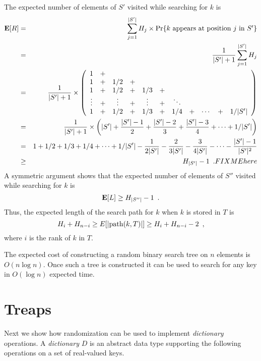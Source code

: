 The expected number of elements of $S'$ visited while searching for
$k$ is
\begin{eqnarray*}
    \mathbf{E}[R]&=& \sum_{j=1}^{|S'|} H_j
	\times\Pr\{\mbox{$k$ appears at position $j$ in $S'$}\} \\
    &=& \frac{1}{|S'|+1}\sum_{j=1}^{|S'|} H_j \\
    &=& \frac{1}{|S'|+1} \times \left(\begin{array}{ccccccccccccccccc}
            1 &+& \\
            1 &+& 1/2 &+& \\
            1 &+& 1/2 &+& 1/3 &+& \\
            \vdots &+& \vdots &+& \vdots &+& \ddots \\
            1 &+& 1/2 &+& 1/3 &+& 1/4 &+&\cdots &+& 1/|S'| \\
	\end{array}\right) \\
    &=& \frac{1}{|S'|+1}\times\left(|S'| + \frac{|S'|-1}{2} +
	\frac{|S'|-2}{3} + \frac{|S'|-3}{4} + \cdots + 1/|S'| \right)\\
    &=& 1 + 1/2 + 1/3 + 1/4 +\cdots + 1/|S'|
	- \frac{1}{2|S'|} - \frac{2}{3|S'|} - \frac{3}{4|S'|} - \cdots
	- \frac{|S'|-1}{|S'|^2} \\
    &\ge& H_{|S'|} - 1 \enspace .   FIXME here
\end{eqnarray*}
A symmetric argument shows that the expected number of elements of
$S''$ visited while searching for $k$ is 
\[
	\mathbf{E}[L]\ge H_{|S''|} - 1 \enspace .
\]
Thus, the expected length of the search path for $k$ when $k$ is
stored in $T$ is
\begin{equation}
	H_i + H_{n-i} \ge E[|\path(k,T)|] \ge H_i + H_{n-i} - 2 \enspace , \eqlabel{path-length-present}
\end{equation}
where $i$ is the rank of $k$ in $T$.

\begin{thm}
The expected cost of constructing a random binary search tree on $n$
elements is $O(n\log n)$.  Once such a tree is constructed it can be
used to search for any key in $O(\log n)$ expected time.
\end{thm}

\section{Treaps}

Next we show how randomization can be used to implement
\emph{dictionary} operations.  A \emph{dictionary} $D$ is an abstract
data type supporting the following operations on a set of
real-valued keys.

